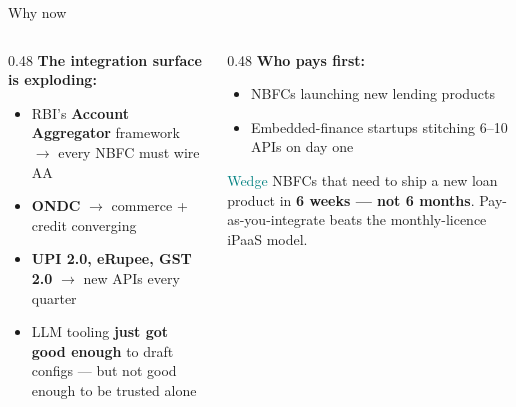 \documentclass[aspectratio=169,11pt]{beamer}
\begin{document}
\begin{frame}{Why now}
\vspace{0.3em}
\begin{columns}[T]
\begin{column}{0.48\textwidth}
\textbf{The integration surface is exploding:}
\begin{itemize}
\item RBI's \textbf{Account Aggregator} framework $\to$ every NBFC must wire AA
\item \textbf{ONDC} $\to$ commerce + credit converging
\item \textbf{UPI 2.0, eRupee, GST 2.0} $\to$ new APIs every quarter
\item LLM tooling \textbf{just got good enough} to draft configs --- but not good enough to be trusted alone
\end{itemize}
\end{column}
\begin{column}{0.48\textwidth}
\textbf{Who pays first:}
\begin{itemize}
\item NBFCs launching new lending products
\item Embedded-finance startups stitching 6--10 APIs on day one
\end{itemize}
\vspace{0.4em}
\begin{block}{\textcolor{teal}{Wedge}}
NBFCs that need to ship a new loan product in \textbf{6 weeks --- not 6 months}. Pay-as-you-integrate beats the monthly-licence iPaaS model.
\end{block}
\end{column}
\end{columns}
\end{frame}
\end{document}
